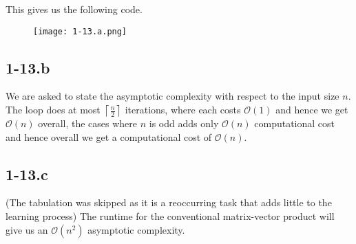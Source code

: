 \documentclass{article}
\begin{document}
\pagebreak

\noindent This gives us the following code.
\begin{figure}[!hbt]
    \centering
\texttt{[image: 1-13.a.png]}
\end{figure}

\subsection*{1-13.b}
We are asked to state the asymptotic complexity with respect to the input size $n$. The loop does at most $\left\lceil \frac{n}{2}\right\rceil$ iterations, where each costs $\mathcal{O}\left(1\right)$ and hence we get $\mathcal{O}\left(n\right)$ overall, the cases where $n$ is odd adds only $\mathcal{O}\left(n\right)$ computational cost and hence overall we get a computational cost of $\mathcal{O}\left(n\right)$.
\subsection*{1-13.c}
(The tabulation was skipped as it is a reoccurring task that adds little to the learning process) The runtime for the conventional matrix-vector product will give us an $\mathcal{O}\left(n^{2}\right)$ asymptotic complexity.
\end{document}
